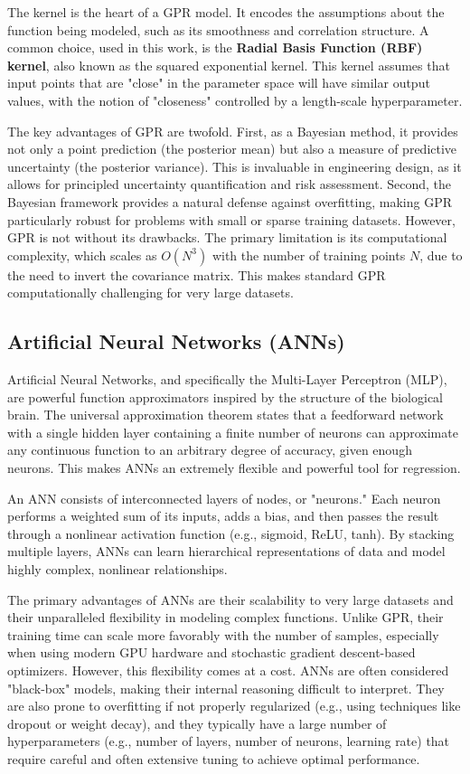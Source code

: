 The kernel is the heart of a GPR model. It encodes the assumptions about the function being modeled, such as its smoothness and correlation structure. A common choice, used in this work, is the \textbf{Radial Basis Function (RBF) kernel}, also known as the squared exponential kernel. This kernel assumes that input points that are "close" in the parameter space will have similar output values, with the notion of "closeness" controlled by a length-scale hyperparameter.

The key advantages of GPR are twofold. First, as a Bayesian method, it provides not only a point prediction (the posterior mean) but also a measure of predictive uncertainty (the posterior variance). This is invaluable in engineering design, as it allows for principled uncertainty quantification and risk assessment. Second, the Bayesian framework provides a natural defense against overfitting, making GPR particularly robust for problems with small or sparse training datasets. However, GPR is not without its drawbacks. The primary limitation is its computational complexity, which scales as $O(N^3)$ with the number of training points $N$, due to the need to invert the covariance matrix. This makes standard GPR computationally challenging for very large datasets.

\subsection{Artificial Neural Networks (ANNs)}

Artificial Neural Networks, and specifically the Multi-Layer Perceptron (MLP), are powerful function approximators inspired by the structure of the biological brain. The universal approximation theorem states that a feedforward network with a single hidden layer containing a finite number of neurons can approximate any continuous function to an arbitrary degree of accuracy, given enough neurons. This makes ANNs an extremely flexible and powerful tool for regression.

An ANN consists of interconnected layers of nodes, or "neurons." Each neuron performs a weighted sum of its inputs, adds a bias, and then passes the result through a nonlinear activation function (e.g., sigmoid, ReLU, tanh). By stacking multiple layers, ANNs can learn hierarchical representations of data and model highly complex, nonlinear relationships.

The primary advantages of ANNs are their scalability to very large datasets and their unparalleled flexibility in modeling complex functions. Unlike GPR, their training time can scale more favorably with the number of samples, especially when using modern GPU hardware and stochastic gradient descent-based optimizers. However, this flexibility comes at a cost. ANNs are often considered "black-box" models, making their internal reasoning difficult to interpret. They are also prone to overfitting if not properly regularized (e.g., using techniques like dropout or weight decay), and they typically have a large number of hyperparameters (e.g., number of layers, number of neurons, learning rate) that require careful and often extensive tuning to achieve optimal performance. 


